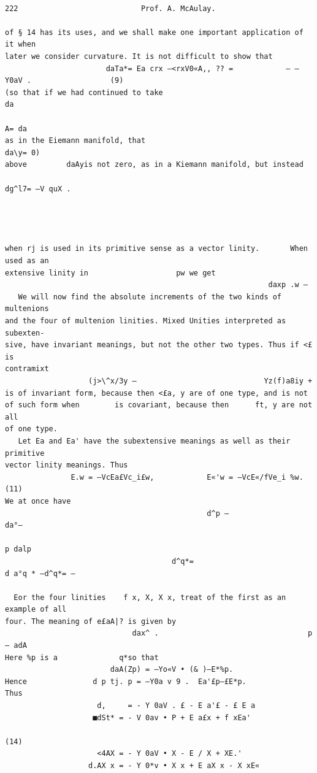 \documentclass[10pt]{article}
\begin{document}
\clearpage
\begin{verbatim}

222                            Prof. A. McAulay.

of § 14 has its uses, and we shall make one important application of it when
later we consider curvature. It is not difficult to show that
                       daTa*= Ea crx —<rxV0«A,, ?? =            — —Y0aV .                  (9)
(so that if we had continued to take                                                  da
                                                                                       A= da
as in the Eiemann manifold, that                                                     da\y= 0)
above         daAyis not zero, as in a Kiemann manifold, but instead
                                                                  dg^l7= —V quX .




when rj is used in its primitive sense as a vector linity.       When used as an
extensive linity in                    pw we get
                                                            daxp .w —
   We will now find the absolute increments of the two kinds of multenions
and the four of multenion linities. Mixed Unities interpreted as subexten-
sive, have invariant meanings, but not the other two types. Thus if <£ is
contramixt
                   (j>\^x/3y —                             Yz(f)a8iy +
is of invariant form, because then <£a, y are of one type, and is not
of such form when        is covariant, because then      ft, y are not all
of one type.
   Let Ea and Ea' have the subextensive meanings as well as their primitive
vector linity meanings. Thus
               E.w = —VcEa£Vc_i£w,            E«'w = —VcE«/fVe_i %w.                (11)
We at once have
                                              d^p —                               da°—
                                                                                     p dalp
                                      d^q*=                             d a°q * —d^q*= —

  Eor the four linities    f x, X, X x, treat of the first as an example of all
four. The meaning of e£aA|? is given by
                             dax^ .                                  p — adA
Here %p is a              q*so that
                        daA(Zp) = —Yo«V • (& )—E*%p.
Hence               d p tj. p = —Y0a v 9 .  Ea'£p—£E*p.
Thus
                     d,     = - Y 0aV . £ - E a'£ - £ E a
                    ■dSt* = - V 0av • P + E a£x + f xEa'
                                                                                    (14)
                     <4AX = - Y 0aV • X - E / X + XE.'
                   d.AX x = - Y 0*v • X x + E aX x - X xE«


\end{verbatim}
\end{document}
